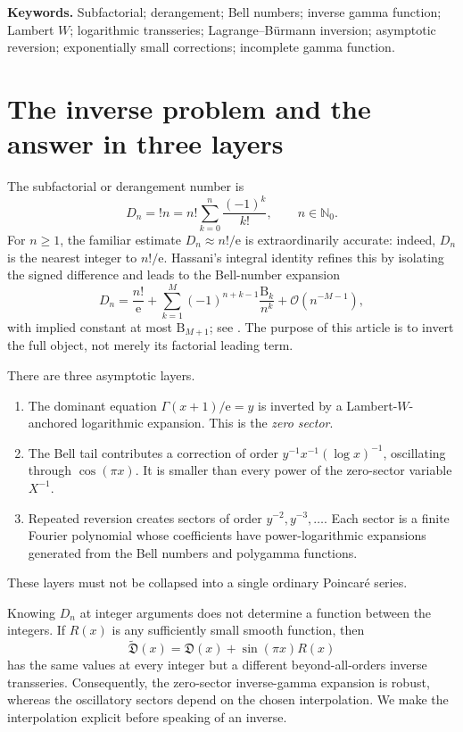 \documentclass[11pt,oneside]{article}
\theoremstyle{plain}
\theoremstyle{definition}
\theoremstyle{remark}
\newcommand{\ee}{\mathrm{e}}
\newcommand{\N}{\mathbb{N}}
\newcommand{\Dfrak}{\mathfrak{D}}
\newcommand{\Bell}{\mathrm{B}}
\newcommand{\bigO}{\mathcal{O}}
\begin{document}
\noindent\textbf{Keywords.}
Subfactorial; derangement; Bell numbers; inverse gamma function; Lambert
\(W\); logarithmic transseries; Lagrange--B\"urmann inversion; asymptotic
reversion; exponentially small corrections; incomplete gamma function.

{\small\tableofcontents}
\clearpage

\section{The inverse problem and the answer in three layers}
\label{sec:introduction}

The subfactorial or derangement number is
\begin{equation}
 D_n={!n}=n!\sum_{k=0}^{n}\frac{(-1)^k}{k!},
 \qquad n\in\N_0.
 \label{eq:derangement-def}
\end{equation}
For \(n\ge1\), the familiar estimate \(D_n\approx n!/\ee\) is extraordinarily accurate:
indeed, \(D_n\) is the nearest integer to \(n!/\ee\).  Hassani's integral
identity refines this by isolating the signed difference and leads to the
Bell-number expansion
\begin{equation}
 D_n=\frac{n!}{\ee}
 +\sum_{k=1}^{M}(-1)^{n+k-1}\frac{\Bell_k}{n^k}
 +\bigO(n^{-M-1}),
 \label{eq:hassani-intro}
\end{equation}
with implied constant at most \(\Bell_{M+1}\); see
\cite{Hassani2020}.  The purpose of this article is to invert the full object,
not merely its factorial leading term.

There are three asymptotic layers.
\begin{enumerate}
\item The dominant equation \(\Gamma(x+1)/\ee=y\) is inverted by a
Lambert-\(W\)-anchored logarithmic expansion.  This is the \emph{zero sector}.
\item The Bell tail contributes a correction of order
\(y^{-1}x^{-1}(\log x)^{-1}\), oscillating through \(\cos(\pi x)\).  It is
smaller than every power of the zero-sector variable \(X^{-1}\).
\item Repeated reversion creates sectors of order \(y^{-2},y^{-3},\ldots\).
Each sector is a finite Fourier polynomial whose coefficients have
power-logarithmic expansions generated from the Bell numbers and polygamma
functions.
\end{enumerate}
These layers must not be collapsed into a single ordinary Poincar\'e series.

\begin{warningbox}[title={An integer sequence does not determine a unique continuous inverse}]
Knowing \(D_n\) at integer arguments does not determine a function between the
integers.  If \(R(x)\) is any sufficiently small smooth function, then
\[
 \widetilde{\Dfrak}(x)=\Dfrak(x)+\sin(\pi x)R(x)
\]
has the same values at every integer but a different beyond-all-orders inverse
transseries.  Consequently, the zero-sector inverse-gamma expansion is robust,
whereas the oscillatory sectors depend on the chosen interpolation.  We make
the interpolation explicit before speaking of an inverse.
\end{warningbox}
\end{document}
